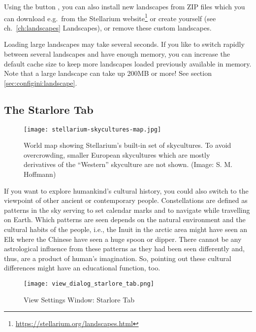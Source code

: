 \noindent Using the button , you can also
install new landscapes from ZIP files which you can download e.g.\
from the Stellarium
website\footnote{\url{https://stellarium.org/landscapes.html}}
or create yourself (see ch.~\ref{ch:landscapes} Landscapes), or remove
these custom landscapes.

Loading large landscapes may take several seconds. 
If you like to switch rapidly between several landscapes and have enough memory, 
you can increase the default cache size to keep more landscapes loaded previously 
available in memory. Note that a large landscape can take up 200MB or more! 
See section \ref{sec:configini:landscape}.

\subsection{The Starlore Tab}
\label{sec:gui:view:starlore}


\begin{figure}[th]\centering
\texttt{[image: stellarium-skycultures-map.jpg]}
\caption{World map showing Stellarium's built-in set of
  skycultures. To avoid overcrowding, smaller European skycultures
  which are mostly derivatives of the ``Western'' skyculture are not
  shown. (Image: S. M. Hoffmann)}
\label{fig:skycultures}
\end{figure}

\noindent If you want to explore humankind's cultural history, you could also
switch to the viewpoint of other ancient or contemporary
people. Constellations are defined as patterns in the sky serving to
set calendar marks and to navigate while travelling on Earth. Which
patterns are seen depends on the natural environment and the cultural
habits of the people, i.e., the Inuit in the arctic area might have
seen an Elk where the Chinese have seen a huge spoon or dipper. There
cannot be any astrological influence from these patterns as they had
been seen differently and, thus, are a product of human's
imagination. So, pointing out these cultural differences might have an
educational function, too.

\begin{figure}[htbp]
\centering\texttt{[image: view\_dialog\_starlore\_tab.png]}
\caption{View Settings Window: Starlore Tab}
\label{fig:gui:view:starlore}
\end{figure}

